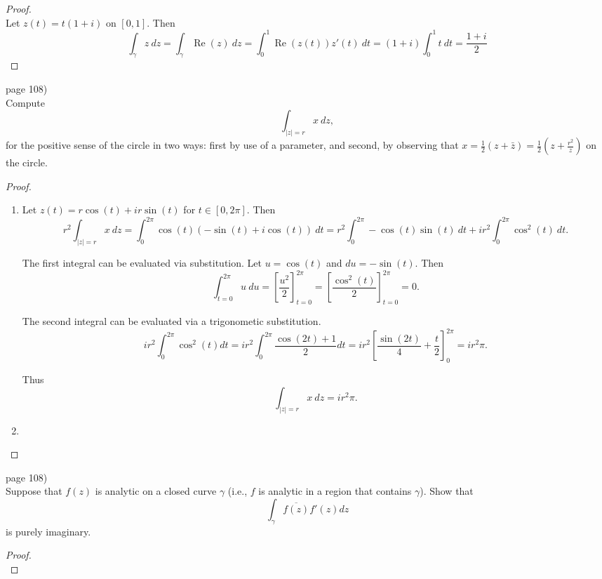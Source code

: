 \documentclass{article}
\newenvironment{problem}[2][Problem]{\begin{trivlist}
\item[\hskip \labelsep {\bfseries #1}\hskip \labelsep {\bfseries #2.}]}{\end{trivlist}}
\begin{document}
\begin{proof} \text{} \\
  Let $z(t) = t(1 + i)$ on $[0, 1]$. Then \[
    \int_\gamma z\ dz = \int_\gamma \operatorname{Re}(z)\ dz
    = \int_0^1 \operatorname{Re}(z(t))z'(t)\ dt
    = (1 + i)\int_0^1 t\ dt
    = \frac{1 + i}{2}
  \]
\end{proof}
\pagebreak

\begin{problem}{2} (page 108) \\
  Compute \[
    \int_{|z| = r} x\ dz,
  \] for the positive sense of the circle in two ways: first by use of a parameter,
  and second, by observing that
  $\displaystyle x=\frac{1}{2}(z + \bar{z}) = \frac{1}{2}\left(z + \frac{r^2}{z}\right)$
  on the circle.
\end{problem}

\begin{proof} \text{} \\
  \begin{enumerate}
  \item Let $z(t)=r\cos(t) + ir\sin(t)$ for $t \in [0, 2\pi]$. Then \[
    r^2\int_{|z|=r}x\ dz = \int_0^{2\pi} \cos(t)(-\sin(t) + i\cos(t))\ dt
    = r^2\int_0^{2\pi} -\cos(t)\sin(t)\ dt + ir^2\int_0^{2\pi} \cos^2(t)\ dt.
  \]

  The first integral can be evaluated via substitution.
  Let $u = \cos(t)$ and $du = -\sin(t)$. Then \[
    \int_{t=0}^{2\pi} u\ du = \left[\frac{u^2}{2}\right]_{t=0}^{2\pi}
    = \left[\frac{\cos^2(t)}{2}\right]_{t=0}^{2\pi}
    = 0.
  \]

  The second integral can be evaluated via a trigonometic substitution. \[
    ir^2\int_0^{2\pi} \cos^2(t) dt = ir^2\int_0^{2\pi} \frac{\cos(2t) + 1}{2} dt
    = ir^2\left[\frac{\sin(2t)}{4} + \frac{t}{2}\right]_0^{2\pi}
    = ir^2\pi.
  \]

  Thus \[
    \int_{|z| = r} x\ dz = ir^2\pi.
  \]
  \item
  \end{enumerate}
\end{proof}
\pagebreak

\begin{problem}{5} (page 108) \\
  Suppose that $f(z)$ is analytic on a closed curve $\gamma$
  (i.e., $f$ is analytic in a region that contains $\gamma$). Show that \[
    \int_\gamma \overline{f(z)}f'(z) dz
  \] is purely imaginary.
\end{problem}

\begin{proof} \text{} \\
\end{proof}
\end{document}
